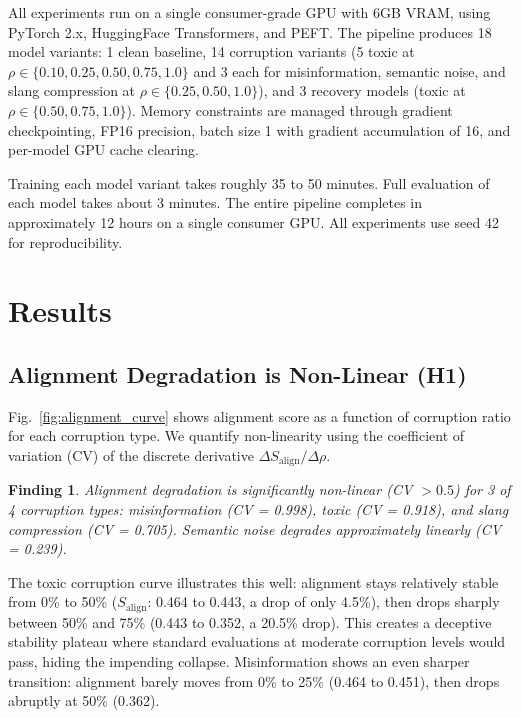 \documentclass[conference]{IEEEtran}
\newtheorem{finding}{Finding}
\begin{document}
All experiments run on a single consumer-grade GPU with 6GB VRAM, using PyTorch 2.x, HuggingFace Transformers, and PEFT. The pipeline produces 18 model variants: 1 clean baseline, 14 corruption variants (5 toxic at $\rho \in \{0.10, 0.25, 0.50, 0.75, 1.0\}$ and 3 each for misinformation, semantic noise, and slang compression at $\rho \in \{0.25, 0.50, 1.0\}$), and 3 recovery models (toxic at $\rho \in \{0.50, 0.75, 1.0\}$). Memory constraints are managed through gradient checkpointing, FP16 precision, batch size 1 with gradient accumulation of 16, and per-model GPU cache clearing.

Training each model variant takes roughly 35 to 50 minutes. Full evaluation of each model takes about 3 minutes. The entire pipeline completes in approximately 12 hours on a single consumer GPU. All experiments use seed 42 for reproducibility.

\section{Results}
\label{sec:results}

\subsection{Alignment Degradation is Non-Linear (H1)}
\label{sec:h1}

Fig.~\ref{fig:alignment_curve} shows alignment score as a function of corruption ratio for each corruption type. We quantify non-linearity using the coefficient of variation (CV) of the discrete derivative $\Delta S_{\text{align}} / \Delta \rho$.

\begin{finding}
Alignment degradation is significantly non-linear (CV $> 0.5$) for 3 of 4 corruption types: misinformation (CV = 0.998), toxic (CV = 0.918), and slang compression (CV = 0.705). Semantic noise degrades approximately linearly (CV = 0.239).
\end{finding}

The toxic corruption curve illustrates this well: alignment stays relatively stable from 0\% to 50\% ($S_{\text{align}}$: 0.464 to 0.443, a drop of only 4.5\%), then drops sharply between 50\% and 75\% (0.443 to 0.352, a 20.5\% drop). This creates a deceptive stability plateau where standard evaluations at moderate corruption levels would pass, hiding the impending collapse. Misinformation shows an even sharper transition: alignment barely moves from 0\% to 25\% (0.464 to 0.451), then drops abruptly at 50\% (0.362).
\end{document}
